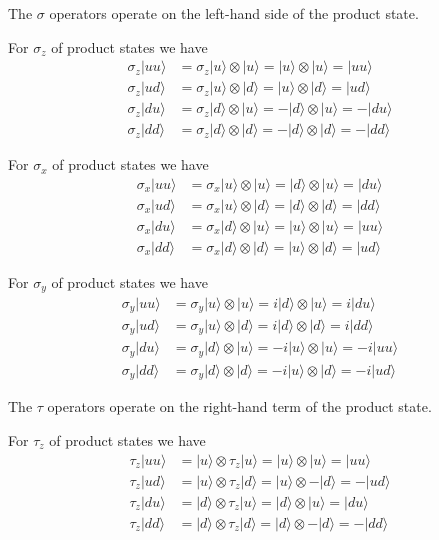 \documentclass[12pt]{article}
\begin{document}
The $\sigma$ operators operate on the left-hand side of the product state.

\bigskip
For $\sigma_z$ of product states we have
\begin{align*}
\sigma_z|uu\rangle&=\sigma_z|u\rangle\otimes|u\rangle
=|u\rangle\otimes|u\rangle=|uu\rangle
\\[1ex]
\sigma_z|ud\rangle&=\sigma_z|u\rangle\otimes|d\rangle
=|u\rangle\otimes|d\rangle=|ud\rangle
\\[1ex]
\sigma_z|du\rangle&=\sigma_z|d\rangle\otimes|u\rangle
=-|d\rangle\otimes|u\rangle=-|du\rangle
\\[1ex]
\sigma_z|dd\rangle&=\sigma_z|d\rangle\otimes|d\rangle
=-|d\rangle\otimes|d\rangle=-|dd\rangle
\end{align*}

For $\sigma_x$ of product states we have
\begin{align*}
\sigma_x|uu\rangle&=\sigma_x|u\rangle\otimes|u\rangle
=|d\rangle\otimes|u\rangle=|du\rangle
\\[1ex]
\sigma_x|ud\rangle&=\sigma_x|u\rangle\otimes|d\rangle
=|d\rangle\otimes|d\rangle=|dd\rangle
\\[1ex]
\sigma_x|du\rangle&=\sigma_x|d\rangle\otimes|u\rangle
=|u\rangle\otimes|u\rangle=|uu\rangle
\\[1ex]
\sigma_x|dd\rangle&=\sigma_x|d\rangle\otimes|d\rangle
=|u\rangle\otimes|d\rangle=|ud\rangle
\end{align*}

For $\sigma_y$ of product states we have
\begin{align*}
\sigma_y|uu\rangle&=\sigma_y|u\rangle\otimes|u\rangle
=i|d\rangle\otimes|u\rangle=i|du\rangle
\\[1ex]
\sigma_y|ud\rangle&=\sigma_y|u\rangle\otimes|d\rangle
=i|d\rangle\otimes|d\rangle=i|dd\rangle
\\[1ex]
\sigma_y|du\rangle&=\sigma_y|d\rangle\otimes|u\rangle
=-i|u\rangle\otimes|u\rangle=-i|uu\rangle
\\[1ex]
\sigma_y|dd\rangle&=\sigma_y|d\rangle\otimes|d\rangle
=-i|u\rangle\otimes|d\rangle=-i|ud\rangle
\end{align*}

The $\tau$ operators operate on the right-hand term of the product state.

\bigskip
For $\tau_z$ of product states we have
\begin{align*}
\tau_z|uu\rangle&=|u\rangle\otimes\tau_z|u\rangle
=|u\rangle\otimes|u\rangle=|uu\rangle
\\[1ex]
\tau_z|ud\rangle&=|u\rangle\otimes\tau_z|d\rangle
=|u\rangle\otimes-|d\rangle=-|ud\rangle
\\[1ex]
\tau_z|du\rangle&=|d\rangle\otimes\tau_z|u\rangle
=|d\rangle\otimes|u\rangle=|du\rangle
\\[1ex]
\tau_z|dd\rangle&=|d\rangle\otimes\tau_z|d\rangle
=|d\rangle\otimes-|d\rangle=-|dd\rangle
\end{align*}
\end{document}
